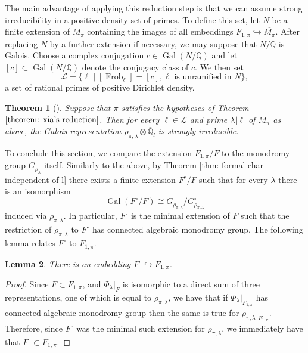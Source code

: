 \documentclass{amsart}
\newtheorem{theorem}{Theorem}[section]
\newtheorem{lemma}[theorem]{Lemma}
\theoremstyle{definition}
\numberwithin{equation}{section} %
\newcommand{\Frob}{\operatorname{Frob}}
\newcommand{\Gal}{\operatorname{Gal}}
\newcommand{\bb}[1]{\mathbb{#1}}
\newcommand{\ol}[1]{\overline{#1}}
\begin{document}
The main advantage of applying this reduction step is that we can assume strong irreducibility in a positive density set of primes.
To define this set, let $N$ be a finite extension of $M_\pi$ containing the images of all embeddings $F_{1,\pi} \hookrightarrow \ol{M_\pi}$.
After replacing $N$ by a further extension if necessary, we may suppose that $N/\bb{Q}$ is Galois.
Choose a complex conjugation $c \in \Gal(N/\bb{Q})$ and let $[c] \subset \Gal(N/\bb{Q})$ denote the conjugacy class of $c$.
We then set
\[\mathcal{L} = \{\ell \mid [\Frob_\ell] = [c], \ell \text{ is unramified in } N \},\]
a set of rational primes of positive Dirichlet density.

\begin{theorem}[{\cite[Corollary 1]{Xia19}}]\label{lemma: lie-irreducible patrikis taylor prime}
   Suppose that $\pi$ satisfies the hypotheses of Theorem $\ref{theorem: xia's reduction}$.
    Then for every $\ell \in \mathcal{L}$ and prime $\lambda|\ell$ of $M_\pi$ as above, the Galois representation \( \rho_{\pi,\lambda} \otimes \ol{\bb{Q}}_l \) is strongly irreducible.
\end{theorem}

To conclude this section, we compare the extension $F_{1,\pi}/F$ to the monodromy group $G_{\rho_\lambda}$ itself.
Similarly to the above, by Theorem \ref{thm: formal char independent of l} there exists a finite extension \( F^\circ/F \) such that for every $\lambda$ there is an isomorphism
\[ \Gal(F^\circ/F) \cong G_{\rho_{\pi,\lambda}} / G_{\rho_{\pi,\lambda}}^\circ \]
induced via \( \rho_{\pi,\lambda} \). In particular, \( F^\circ \) is the minimal extension of \( F \) such that the restriction of \( \rho_{\pi,\lambda} \) to \( F^\circ \) has connected algebraic monodromy group.
The following lemma relates \( F^\circ \) to \( F_{1,\pi} \).

\begin{lemma} \label{lemma: F1,pi contains Fcirc}
There is an embedding \( F^\circ \hookrightarrow F_{1,\pi} \).
\end{lemma}
\begin{proof}
Since \( F\subset F_{1,\pi} \), and \( \Phi_\lambda|_F \) is isomorphic to a direct sum of three representations, one of which is equal to \( \rho_{\pi,\lambda} \), we have that if \( \Phi_\lambda|_{F_{1,\pi}} \) has connected algebraic monodromy group then the same is true for \( \rho_{\pi,\lambda}|_{F_{1,\pi}} \). Therefore, since \( F^\circ \) was the minimal such extension for \( \rho_{\pi,\lambda} \), we immediately have that \( F^\circ\subset F_{1,\pi} \).
\end{proof}
\end{document}

